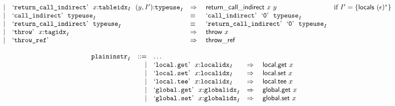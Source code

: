 $$\begin{array}[t]{@{}lrrl@{}l@{}l@{}l@{}}
& & | & \mbox{‘\texttt{return\_call\_indirect}’}~~x{:}{{\mathtt{tableidx}}}_{I}~~(y, {I'}){:}{{\mathtt{typeuse}}}_{I} & \quad\Rightarrow\quad{} & \mathsf{return\_call\_indirect}~x~y & \quad \mbox{if}~ {I'} = \{ \mathsf{locals}~{(\epsilon)^\ast} \} \\
& & | & \mbox{‘\texttt{call\_indirect}’}~~{{\mathtt{typeuse}}}_{I} & \quad\equiv\quad{} & \mbox{‘\texttt{call\_indirect}’}~~\mbox{‘\texttt{0}’}~~{{\mathtt{typeuse}}}_{I} \\
& & | & \mbox{‘\texttt{return\_call\_indirect}’}~~{{\mathtt{typeuse}}}_{I} & \quad\equiv\quad{} & \mbox{‘\texttt{return\_call\_indirect}’}~~\mbox{‘\texttt{0}’}~~{{\mathtt{typeuse}}}_{I} \\
& & | & \mbox{‘\texttt{throw}’}~~x{:}{{\mathtt{tagidx}}}_{I} & \quad\Rightarrow\quad{} & \mathsf{throw}~x \\
& & | & \mbox{‘\texttt{throw\_ref}’} & \quad\Rightarrow\quad{} & \mathsf{throw\_ref} \\
\end{array}
$$

\vspace{1ex}

$$
\begin{array}[t]{@{}lrrl@{}l@{}l@{}l@{}}
& {{\mathtt{plaininstr}}}_{I} & ::= & \dots \\
& & | & \mbox{‘\texttt{local.get}’}~~x{:}{{\mathtt{localidx}}}_{I} & \quad\Rightarrow\quad{} & \mathsf{local{.}get}~x \\
& & | & \mbox{‘\texttt{local.set}’}~~x{:}{{\mathtt{localidx}}}_{I} & \quad\Rightarrow\quad{} & \mathsf{local{.}set}~x \\
& & | & \mbox{‘\texttt{local.tee}’}~~x{:}{{\mathtt{localidx}}}_{I} & \quad\Rightarrow\quad{} & \mathsf{local{.}tee}~x \\
& & | & \mbox{‘\texttt{global.get}’}~~x{:}{{\mathtt{globalidx}}}_{I} & \quad\Rightarrow\quad{} & \mathsf{global{.}get}~x \\
& & | & \mbox{‘\texttt{global.set}’}~~x{:}{{\mathtt{globalidx}}}_{I} & \quad\Rightarrow\quad{} & \mathsf{global{.}set}~x \\
\end{array}
$$

\vspace{1ex}

